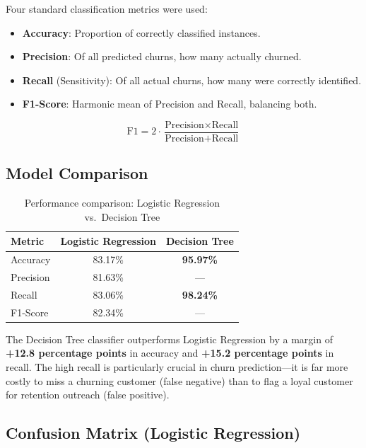 \documentclass[12pt, a4paper]{article}
\begin{document}
Four standard classification metrics were used:

\begin{itemize}
    \item \textbf{Accuracy}: Proportion of correctly classified instances.
    \item \textbf{Precision}: Of all predicted churns, how many actually churned.
    \item \textbf{Recall} (Sensitivity): Of all actual churns, how many were correctly identified.
    \item \textbf{F1-Score}: Harmonic mean of Precision and Recall, balancing both.
\end{itemize}

\begin{equation}
    \text{F1} = 2 \cdot \frac{\text{Precision} \times \text{Recall}}{\text{Precision} + \text{Recall}}
\end{equation}

\subsection{Model Comparison}

\begin{table}[H]
\centering
\caption{Performance comparison: Logistic Regression vs.\ Decision Tree}
\label{tab:results}
\renewcommand{\arraystretch}{1.3}
\begin{tabular}{@{} l c c @{}}
\toprule
\textbf{Metric} & \textbf{Logistic Regression} & \textbf{Decision Tree} \\
\midrule
Accuracy  & 83.17\% & \textbf{95.97\%} \\
Precision & 81.63\% & --- \\
Recall    & 83.06\% & \textbf{98.24\%} \\
F1-Score  & 82.34\% & --- \\
\bottomrule
\end{tabular}
\end{table}

The Decision Tree classifier outperforms Logistic Regression by a margin of \textbf{+12.8 percentage points} in accuracy and \textbf{+15.2 percentage points} in recall. The high recall is particularly crucial in churn prediction---it is far more costly to miss a churning customer (false negative) than to flag a loyal customer for retention outreach (false positive).

\subsection{Confusion Matrix (Logistic Regression)}
\end{document}
